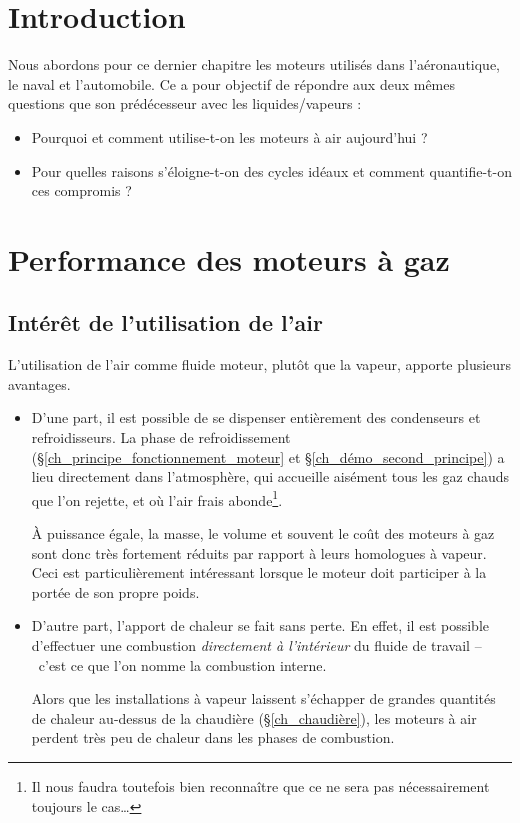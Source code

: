 \section*{Introduction}

	Nous abordons pour ce dernier chapitre les moteurs utilisés dans l’aéronautique, le naval et l’automobile. Ce \coursdix a pour objectif de répondre aux deux mêmes questions que son prédécesseur avec les liquides/vapeurs :

	\begin{itemize}
		\item Pourquoi et comment utilise-t-on les moteurs à air aujourd’hui ?
		\item Pour quelles raisons s’éloigne-t-on des cycles idéaux et comment quantifie-t-on ces compromis ?
	\end{itemize}\dontbreakpage \vspace{2em}





\section{Performance des moteurs à gaz}



	\subsection{Intérêt de l’utilisation de l’air}

		L’utilisation de l’air comme fluide moteur, plutôt que la vapeur, apporte plusieurs avantages.

		\begin{itemize}
			\item D’une part, il est possible de se dispenser entièrement des condenseurs et refroidisseurs. La phase de refroidissement (\S\ref{ch_principe_fonctionnement_moteur} et \S\ref{ch_démo_second_principe}) a lieu directement dans l’atmosphère, qui accueille aisément tous les gaz chauds que l’on rejette, et où l’air frais abonde\footnote{Il nous faudra toutefois bien reconnaître que ce ne sera pas nécessairement toujours le cas…}.

			À puissance égale, la masse, le volume et souvent le coût des moteurs à gaz sont donc très fortement réduits par rapport à leurs homologues à vapeur. Ceci est particulièrement intéressant lorsque le moteur doit participer à la portée de son propre poids.

			\item D’autre part, l’apport de chaleur se fait sans perte. En effet, il est possible d’ef\-fec\-tuer une combustion \emph{directement à l’intérieur} du fluide de travail --\ c’est ce que l’on nomme la combustion interne. 

			Alors que les installations à vapeur laissent s’échapper de grandes quantités de chaleur au-dessus de la chaudière (\S\ref{ch_chaudière}), les moteurs à air perdent très peu de chaleur dans les phases de combustion.

		\end{itemize}

